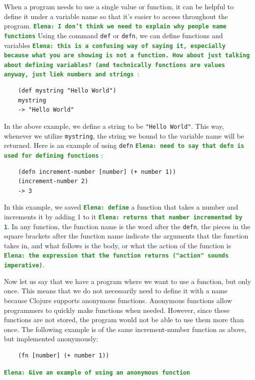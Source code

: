 \documentclass[12pt]{article}
\newcommand{\comment}[1]{{\bf \tt  {#1}}}
\newcommand{\emcomment}[1]{\textcolor{ForestGreen}{\comment{Elena: {#1}}}}
\begin{document}

When a program needs to use a single value or function, it can be helpful to define it under a variable name
so that it's easier to access throughout the program. 
\emcomment{I don't think we need to explain why people name functions} 
Using the command \texttt{def} or \texttt{defn}, we
can define functions and variables \emcomment{this is a confusing way of saying it, especially because what you are showing is not a function. How about just talking about defining variables? (and technically functions are values anyway, just liek numbers and strings }:
\begin{verbatim}
	(def mystring "Hello World")
	mystring
	-> "Hello World"
\end{verbatim}

In the above example, we define a string to be \texttt{"Hello World"}. This way, whenever we utilize 
\texttt{mystring}, the string we bound to the variable name will be returned. Here is an example of using \texttt{defn} \emcomment{need to say that defn is used for defining functions} :
\begin{verbatim}
	(defn increment-number [number] (+ number 1))
	(increment-number 2)
	-> 3
\end{verbatim}

In this example, we saved \emcomment{define} a function that takes a number and increments it by adding 1 to it \emcomment{returns that number incremented by 1}. 
In any function, the 
function name is the word after the \texttt{defn}, the pieces in the square brackets after the function name indicate 
the arguments that the function takes in, and what follows is the body, or what the action of the function is \emcomment{the expression that the function returns ("action" sounds imperative)}. 

Now let us say that we have a program where we want to use a function, but only once. This means that we do not
necessarily need to define it with a name because Clojure supports anonymous functions. Anonymous functions allow 
programmers to quickly make
functions when needed. 
However, since these functions are not  stored, the program would not be able to use them more than once. 
The following example is of the same increment-number function as above, but implemented anonymously: 
\begin{verbatim}
	(fn [number] (+ number 1))
\end{verbatim}
\emcomment{Give an example of using an anonymous function}
\end{document}
